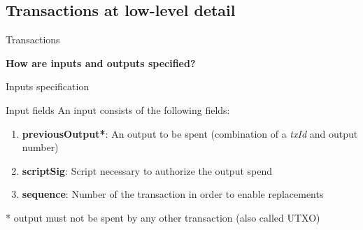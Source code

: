 \documentclass{beamer}
\begin{document}
\subsection{Transactions at low-level detail}
\begin{frame}{Transactions}
\end{frame}
\begin{frame}
 \begin{center}
  \textbf{How are inputs and outputs specified?}
 \end{center}
\end{frame}
\begin{frame}{Inputs specification}
 \begin{block}{Input fields}
  An input consists of the following fields:
  \pause
  \begin{enumerate}[<+->]
   \item \textbf{previousOutput*}: An output to be spent (combination of a \textit{txId} and output number)
   \item \textbf{scriptSig}: Script necessary to authorize the output spend
   \item \textbf{sequence}: Number of the transaction in order to enable replacements
  \end{enumerate}
  \pause
  * output must not be spent by any other transaction (also called UTXO)
 \end{block}
\end{frame}
\end{document}
